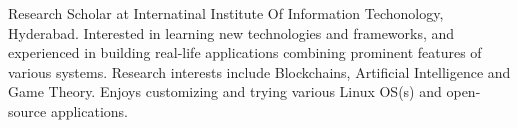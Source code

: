 


\begin{cvparagraph}

    Research Scholar at Internatinal Institute Of Information Techonology, Hyderabad.
    Interested in learning new technologies and frameworks, and experienced in building real-life applications combining prominent features of various systems.
    Research interests include Blockchains, Artificial Intelligence and Game Theory.
    Enjoys customizing and trying various Linux OS(s) and open-source applications.
\end{cvparagraph}
